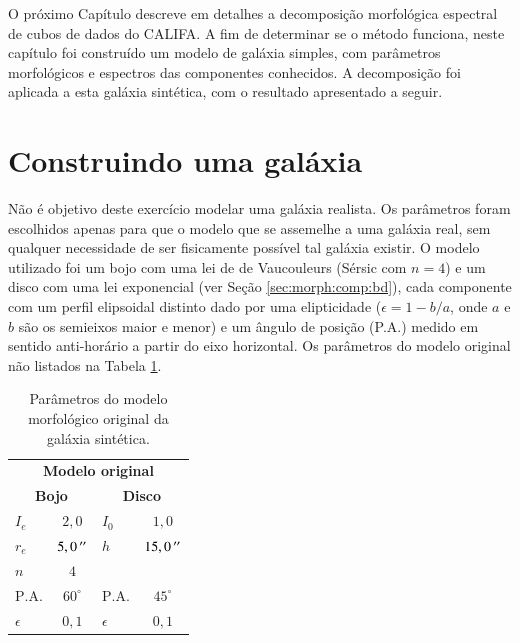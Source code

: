 O próximo Capítulo descreve em detalhes a decomposição morfológica espectral de
cubos de dados do CALIFA. A fim de determinar se o método funciona, neste
capítulo foi construído um modelo de galáxia simples, com parâmetros
morfológicos e espectros das componentes conhecidos. A decomposição foi aplicada
a esta galáxia sintética, com o resultado apresentado a seguir.

\section{Construindo uma galáxia}

Não é objetivo deste exercício modelar uma galáxia realista. Os parâmetros foram
escolhidos apenas para que o modelo que se assemelhe a uma galáxia real, sem
qualquer necessidade de ser fisicamente possível tal galáxia existir. O modelo
utilizado foi um bojo com uma lei de de Vaucouleurs (Sérsic com $n=4$) e um
disco com uma lei exponencial (ver Seção \ref{sec:morph:comp:bd}), cada
componente com um perfil elipsoidal distinto dado por uma elipticidade
($\epsilon = 1 - b/a$, onde $a$ e $b$ são os semieixos maior e menor) e um
ângulo de posição (P.A.) medido em sentido anti-horário a partir do eixo
horizontal. Os parâmetros do modelo original não listados na Tabela
\ref{tab:testeModeloOriginal}.

\begin{table}
\begin{tabular}{ l  c | l  c }
  \hline
  \multicolumn{4}{c}{\textbf{Modelo original}} \\
  \multicolumn{2}{c}{\textbf{Bojo}} & \multicolumn{2}{c}{\textbf{Disco}} \\
  \hline
  $I_e$ & $2,0$ & $I_0$ & $1,0$ \\
  $r_e$ & $5,0\,^{\prime\prime}$ & $h$ & $15,0\,^{\prime\prime}$ \\
  $n$ & $4$ & & \\
  $\mathrm{P.A.}$ & $60^\circ$ & $\mathrm{P.A.}$ & $45^\circ$ \\
  $\epsilon$ & $0,1$ & $\epsilon$ & $0,1$ \\
  \hline
\end{tabular}
\caption[Modelo morfológico original da galáxia sintética]
{Parâmetros do modelo morfológico original da galáxia sintética.}
\label{tab:testeModeloOriginal}
\end{table}

